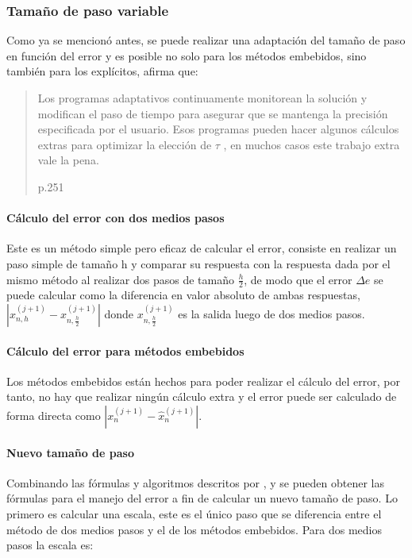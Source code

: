         \subsubsection{Tamaño de paso variable}

            Como ya se mencionó antes, se puede realizar una adaptación del tamaño de paso en función del error y es posible no solo para los métodos embebidos, sino también para los explícitos, \textcite{roganprogramacion} afirma que: \blockquote[p.251]{Los programas adaptativos continuamente monitorean la solución y modifican el paso de
            tiempo para asegurar que se mantenga la precisión especificada por el usuario. Esos programas
            pueden hacer algunos cálculos extras para optimizar la elección de $\tau$ , en muchos casos este
            trabajo extra vale la pena.}

            
            \paragraph{Cálculo del error con dos medios pasos}

                Este es un método simple pero eficaz de calcular el error, consiste en realizar un paso simple de tamaño h y comparar su respuesta con la respuesta dada por el mismo método al realizar dos pasos de tamaño $\frac{h}{2}$, de modo que el error $\Delta e$ se puede calcular como la diferencia en valor absoluto de ambas respuestas, $\left|x_{n,h}^{(j+1)} - x_{n,\frac{h}{2}}^{(j+1)}\right|$ donde $x_{n,\frac{h}{2}}^{(j+1)}$ es la salida luego de dos medios pasos.
            
            \paragraph{Cálculo del error para métodos embebidos} 

                Los métodos embebidos están hechos para poder realizar el cálculo del error, por tanto, no hay que realizar ningún cálculo extra y el error puede ser calculado de forma directa como $\left\lvert x_n^{(j+1)} - \hat{x}_n^{(j+1)} \right\rvert $.

            \paragraph{Nuevo tamaño de paso}

                Combinando las fórmulas y algoritmos descritos por \textcite{roganprogramacion}, \textcite{hairer1991solving} y \textcite{ritschel2013numerical} se pueden obtener las fórmulas para el manejo del error a fin de calcular un nuevo tamaño de paso. Lo primero es calcular una escala, este es el único paso que se diferencia entre el método de dos medios pasos y el de los métodos embebidos. Para dos medios pasos la escala es:

